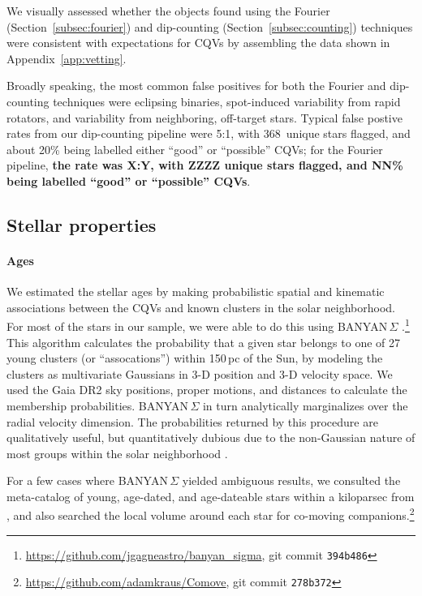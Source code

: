\documentclass[11pt,twocolumn,tighten]{aastex63}
\newcommand{\nuniqdipflagged}{{368}} %
\begin{document}
We visually assessed whether the objects found using the Fourier
(Section~\ref{subsec:fourier}) and dip-counting
(Section~\ref{subsec:counting}) techniques were consistent with
expectations for CQVs by assembling the data shown in
Appendix~\ref{app:vetting}.

Broadly speaking, the most common false positives for both the Fourier
and dip-counting techniques were eclipsing binaries, spot-induced
variability from rapid rotators, and variability from neighboring,
off-target stars.  Typical false postive rates from our dip-counting
pipeline were 5:1, with \nuniqdipflagged\ unique stars flagged, and
about 20\% being labelled either ``good'' or ``possible'' CQVs; for
the Fourier pipeline, {\bf the rate was X:Y, with ZZZZ unique stars
flagged, and NN\% being labelled ``good'' or ``possible'' CQVs}.


\subsection{Stellar properties}
\label{subsec:starprops}

\paragraph{Ages}
We estimated the stellar ages by making probabilistic spatial and
kinematic associations between the CQVs and known clusters in the
solar neighborhood.  For most of the stars in our sample, we were able
to do this using BANYAN\,$\Sigma$
\citep{2018ApJ...856...23G}.\footnote{\url{https://github.com/jgagneastro/banyan_sigma},
git commit \texttt{394b486}} This algorithm calculates the probability
that a given star belongs to one of 27 young clusters (or
``assocations'') within 150\,pc of the Sun, by modeling the clusters
as multivariate Gaussians in 3-D position and 3-D velocity space.  We
used the Gaia DR2 sky positions, proper motions, and distances to
calculate the membership probabilities.  BANYAN\,$\Sigma$ in turn
analytically marginalizes over the radial velocity dimension.  The
probabilities returned by this procedure are qualitatively useful, but
quantitatively dubious due to the non-Gaussian nature of most groups
within the solar neighborhood \citep[see
e.g.][Figure~10]{2021ApJ...917...23K}.

For a few cases where BANYAN\,$\Sigma$ yielded ambiguous results, we
consulted the meta-catalog of young, age-dated, and age-dateable stars
within a kiloparsec from \citet{2022AJ....163..121B}, and also
searched the local volume around each star for co-moving
companions.\footnote{\url{https://github.com/adamkraus/Comove}, git
commit \texttt{278b372}}
\end{document}
